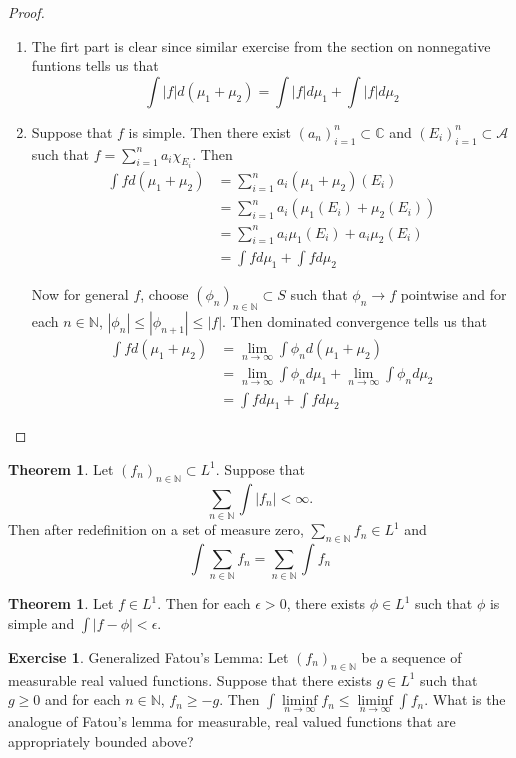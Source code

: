 \documentclass[12pt]{amsart}
\theoremstyle{definition}
\newtheorem{thm}[definition]{Theorem}
\newtheorem{ex}[definition]{Exercise}
\newcommand{\ep}{\epsilon}
\newcommand{\C}{\mathbb{C}}
\newcommand{\N}{\mathbb{N}}
\newcommand{\MA}{\mathcal{A}}
\newcommand{\limfn}{\liminf \limits_{n \rightarrow \infty}}
\newcommand{\limn}{\lim \limits_{n \rightarrow \infty}}
\begin{document}
	\begin{proof}
		\begin{enumerate}
			\item The firt part is clear since similar exercise from the section on nonnegative funtions tells us that $$\int |f| d(\mu_1 + \mu_2) = \int |f| d \mu_1 + \int |f| d\mu_2$$
			
			
			\item Suppose that $f$ is simple. Then there exist $(a_n)_{i=1}^n \subset \C$ and $(E_i)_{i=1}^n \subset \MA$ such that $f = \sum\limits_{i =1}^n a_i \chi_{E_i}$. Then 
			\begin{align*}
				\int f d(\mu_1 + \mu_2) 
				&= \sum\limits_{i =1}^n a_i (\mu_1 + \mu_2)(E_i)\\
				&= \sum\limits_{i =1}^n a_i (\mu_1(E_i) + \mu_2(E_i))\\
				&= \sum\limits_{i =1}^n a_i \mu_1(E_i) + a_i \mu_2(E_i)\\
				&= \int f d\mu_1 + \int f d\mu_2
			\end{align*}
			
			Now for general $f$, choose $(\phi_n)_{n \in \N} \subset S$ such that $\phi_n \rightarrow f$ pointwise and for each $n \in \N$, $|\phi_n| \leq |\phi_{n+1}| \leq |f|$. Then dominated convergence tells us that 
			\begin{align*}
				\int f d(\mu_1 + \mu_2) 
				&= \limn \int \phi_n d(\mu_1 + \mu_2)\\
				&= \limn \int \phi_n d \mu_1 + \limn \int \phi_n d \mu_2 \\
				&= \int f d \mu_1 + \int f d \mu_2
			\end{align*}
			
		\end{enumerate}
	\end{proof}
	
	\begin{thm}
		Let $(f_n)_{n \in \N} \subset L^1$. Suppose that $$\sum_{n \in \N} \int |f_n| < \infty.$$ Then after redefinition on a set of measure zero, $\sum_{n \in \N}f_n \in L^1$ and $$\int \sum_{n \in \N}f_n = \sum_{n \in \N} \int f_n$$
	\end{thm}
	
	\begin{thm}
		Let $f \in L^1$. Then for each $\ep > 0$, there exists $\phi \in L^1$ such that $\phi$ is simple and $\int |f - \phi| < \ep$. 
	\end{thm}
	
	\begin{ex}{Generalized Fatou's Lemma:}
		Let $(f_n)_{n \in \N}$ be a sequence of measurable real valued functions. Suppose that there exists $g \in L^1$ such that $g \geq 0$ and for each $n \in \N$, $f_n \geq -g$. Then $ \int \limfn f_n \leq \limfn \int f_n$. What is the analogue of Fatou's lemma for measurable, real valued functions that are appropriately bounded above?  
	\end{ex}
	
\end{document}
